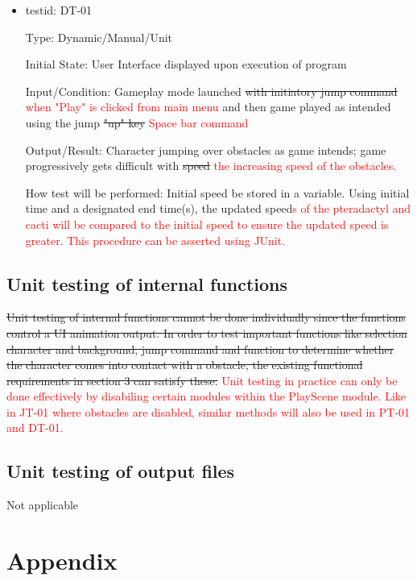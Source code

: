 \documentclass[12pt, titlepage]{article}
\begin{document}
\begin{itemize}
\item{testid: DT-01}

Type: Dynamic/Manual/Unit
					
Initial State: User Interface displayed upon execution of program
					
Input/Condition: Gameplay mode launched \sout{with initiatory jump command} \textcolor{red}{when "Play" is clicked from main menu} and then game played as intended using the jump \sout{"up" key} \textcolor{red}{Space bar command}
					
Output/Result: Character jumping over obstacles as game intends; game progressively gets difficult with \sout{speed} \textcolor{red}{the increasing speed of the obstacles.}
					
How test will be performed: Initial speed be stored in a variable. Using initial time and a designated end time(s), the updated speed\textcolor{red}{s of the pteradactyl and cacti will be compared to the initial speed to ensure the updated speed is greater. This procedure can be asserted using JUnit.}
\end{itemize}
\subsection{Unit testing of internal functions}
\sout{Unit testing of internal functions cannot be done individually since the functions control a UI animation output. In order to test important functions like selection character and background, jump command and function to determine whether the character comes into contact with a obstacle, the existing functional requirements in section 3 can satisfy these.} \textcolor{red}{Unit testing in practice can only be done effectively by disabiling certain modules within the PlayScene module. Like in JT-01 where obstacles are disabled, similar methods will also be used in PT-01 and DT-01.}
		
\subsection{Unit testing of output files}	
Not applicable	





\newpage

\section{Appendix}
\end{document}
